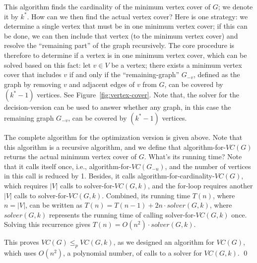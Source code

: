 This algorithm finds the cardinality of the minimum vertex cover of $G$; we denote it by $k^*$.
How can we then find the actual vertex cover? Here is one strategy:
we determine a single vertex that must be in one minimum vertex cover; if
this can be done, we can then
include that vertex (to the minimum vertex cover) and resolve the ``remaining part'' of the graph recursively.
The core procedure is therefore to determine if a vertex is in one minimum vertex cover,
which can be solved based on this fact: let $v\in V$ be a vertex; 
there exists a minimum vertex cover that includes $v$
if and only if the ``remaining-graph'' $G_{-v}$, defined as the graph by removing $v$ and adjacent edges of $v$ from $G$, can
be covered by $(k^* - 1)$ vertices. 
See Figure~\ref{fig:vertex-cover}.  
Note that, the solver for the decision-version can be used to answer 
whether any graph, in this case the remaining graph $G_{-v}$, can be covered by $(k^* - 1)$ vertices. 


\begin{algorithmblock}[0.8\textwidth]
	\xxx
	\xxx
	\xxx
	\xxx
	\xxx
	\xxx
	\xxx
	\xxx
\end{algorithmblock}

The complete algorithm for the optimization version is given above.
Note that this algorithm is a recursive algorithm, and we define
that algorithm-for-$VC(G)$ returns the actual minimum vertex cover of $G$.
What's its running time? Note that it calls itself once, i.e., 
algorithm-for-$VC(G_{-u})$, and the number of vertices in this call
is reduced by 1. Besides, it calls algorithm-for-cardinality-$VC(G)$,
which requires $|V|$ calls to solver-for-$VC(G, k)$,
and the for-loop requires another $|V|$ calls to solver-for-$VC(G, k)$.
Combined, its running time $T(n)$, where $n = |V|$, can be written
as $T(n) = T(n-1) + 2n\cdot solver(G,k)$, where $solver(G,k)$ represents
the running time of calling solver-for-$VC(G, k)$ once.
Solving this recurrence gives $T(n) = O(n^2)\cdot solver(G,k)$.

This proves $VC(G) \le_p VC(G,k)$, as we designed an algorithm
for $VC(G)$, which uses $O(n^2)$, a polynomial number, of calls
to a solver for $VC(G, k)$. \qed


